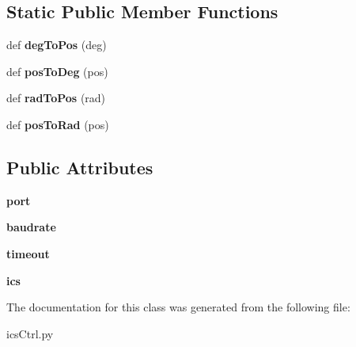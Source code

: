 \subsection*{Static Public Member Functions}
\begin{DoxyCompactItemize}
\item 
def {\bfseries deg\+To\+Pos} (deg)\hypertarget{classkondoServoLib_1_1icsCtrl_1_1IcsClass_a5b9b72bdf06e6c78bf1f2907bf0f1d15}{}\label{classkondoServoLib_1_1icsCtrl_1_1IcsClass_a5b9b72bdf06e6c78bf1f2907bf0f1d15}

\item 
def {\bfseries pos\+To\+Deg} (pos)\hypertarget{classkondoServoLib_1_1icsCtrl_1_1IcsClass_a0d25a060b18480d9e283aee0366b1b3f}{}\label{classkondoServoLib_1_1icsCtrl_1_1IcsClass_a0d25a060b18480d9e283aee0366b1b3f}

\item 
def {\bfseries rad\+To\+Pos} (rad)\hypertarget{classkondoServoLib_1_1icsCtrl_1_1IcsClass_a284b708647fd3f80d5ee11b9f5daf6bc}{}\label{classkondoServoLib_1_1icsCtrl_1_1IcsClass_a284b708647fd3f80d5ee11b9f5daf6bc}

\item 
def {\bfseries pos\+To\+Rad} (pos)\hypertarget{classkondoServoLib_1_1icsCtrl_1_1IcsClass_a88d1476fc38cfe8677c6227085bb2a90}{}\label{classkondoServoLib_1_1icsCtrl_1_1IcsClass_a88d1476fc38cfe8677c6227085bb2a90}

\end{DoxyCompactItemize}
\subsection*{Public Attributes}
\begin{DoxyCompactItemize}
\item 
{\bfseries port}\hypertarget{classkondoServoLib_1_1icsCtrl_1_1IcsClass_adf9b21821a5008ed7aa6dde236bf8446}{}\label{classkondoServoLib_1_1icsCtrl_1_1IcsClass_adf9b21821a5008ed7aa6dde236bf8446}

\item 
{\bfseries baudrate}\hypertarget{classkondoServoLib_1_1icsCtrl_1_1IcsClass_a2d27b4e54f5ac5ba01388857f764a17f}{}\label{classkondoServoLib_1_1icsCtrl_1_1IcsClass_a2d27b4e54f5ac5ba01388857f764a17f}

\item 
{\bfseries timeout}\hypertarget{classkondoServoLib_1_1icsCtrl_1_1IcsClass_a6b1cc36366a3d2dcf04375df0317e054}{}\label{classkondoServoLib_1_1icsCtrl_1_1IcsClass_a6b1cc36366a3d2dcf04375df0317e054}

\item 
{\bfseries ics}\hypertarget{classkondoServoLib_1_1icsCtrl_1_1IcsClass_a4097888dc5c9e81e7ca61b69ac311a02}{}\label{classkondoServoLib_1_1icsCtrl_1_1IcsClass_a4097888dc5c9e81e7ca61b69ac311a02}

\end{DoxyCompactItemize}


The documentation for this class was generated from the following file\+:\begin{DoxyCompactItemize}
\item 
ics\+Ctrl.\+py\end{DoxyCompactItemize}
